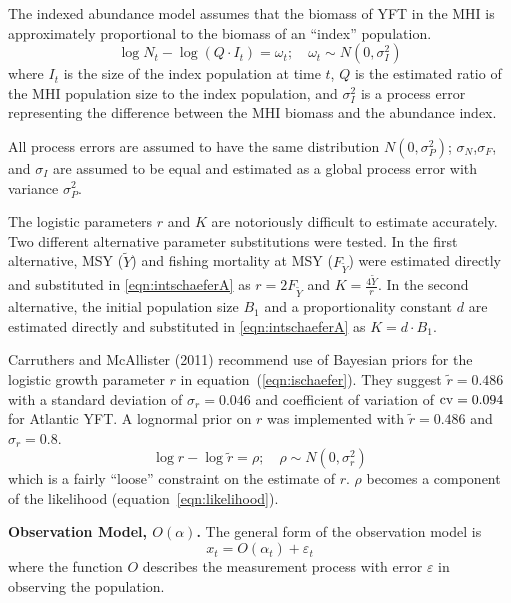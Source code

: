 \documentclass[12pt,letterpaper,twoside]{article}
\newcommand\MSY{\widetilde{Y}}
\newcommand\Fmsy{F_{\MSY}}
\begin{document}
The indexed abundance model assumes that the biomass of YFT in the MHI
is approximately proportional to the biomass of an ``index''
population.
\begin{equation}
\log N_t - \log (Q\cdot I_t) = \omega_t;\quad \omega_t\sim N(0,\sigma^2_I)
\label{eqn:index}
\end{equation}
where
$I_t$ is the size of the index population at time $t$,
$Q$ is the estimated ratio of the MHI population size to the index
population,
and $\sigma^2_I$ is a process error representing the difference
between the MHI biomass and the abundance index. 

All process errors are assumed to have the same distribution
$N(0,\sigma^2_P)$; $\sigma_N$,$\sigma_F$, and $\sigma_I$ are assumed
to be equal and estimated as a global process error with variance
$\sigma^2_P$.

The logistic parameters $r$ and $K$ are notoriously difficult to estimate
accurately. Two different
alternative parameter substitutions were tested. In the first
alternative, MSY ($\MSY$) and fishing mortality at MSY ($\Fmsy$) were
estimated directly and substituted in \ref{eqn:intschaeferA} as
$r=2F_{\MSY}$ and $K=\frac{4\MSY}{r}$.
In the second alternative, the initial population size $B_1$ and a
proportionality constant $d$ are estimated directly and substituted in
\ref{eqn:intschaeferA} as $K=d\cdot B_1$.

Carruthers and McAllister (2011) recommend use of Bayesian priors for the
logistic growth parameter $r$ in equation~(\ref{eqn:ischaefer}). They
suggest $\tilde{r} = 0.486$ with a standard deviation of $\sigma_r = 0.046$
and coefficient of variation of ${\rm cv}=0.094$ for Atlantic YFT.
A lognormal prior on $r$ was implemented with 
$\tilde{r} = 0.486$ and $\sigma_r = 0.8$.
\begin{equation}
\log r - \log \tilde{r} = \rho ;\quad \rho\sim N(0,\sigma^2_r)
\end{equation}
which is a fairly ``loose'' constraint on the estimate of $r$.
$\rho$ becomes a component of the likelihood
(equation~\ref{eqn:likelihood}).

{\bf Observation Model, $O(\alpha)$.}
The general form of the observation model is
\begin{equation}
x_t = O(\alpha_t) + \varepsilon_t
\end{equation}
where the function $O$ describes the measurement process with
error $\varepsilon$ in observing the population.
\end{document}

